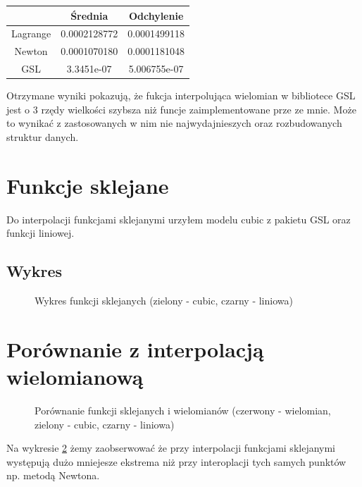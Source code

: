 \documentclass{article}
\begin{document}
    \vspace{10px}

    \begin{tabular}{|c|c|c|}
        \hline 
        &Średnia&Odchylenie\\
        \hline 
        Lagrange&0.0002128772&0.0001499118\\
        \hline 
        Newton&0.0001070180&0.0001181048\\
        \hline 
        GSL&3.3451e-07&5.006755e-07\\
        \hline 
    \end{tabular}

    \vspace{10px}
    
    Otrzymane wyniki pokazują, że fukcja interpolująca wielomian w bibliotece GSL jest o 3 rzędy wielkości szybsza niż funcje zaimplementowane prze ze mnie. 
    Może to wynikać z zastosowanych w nim nie najwydajnieszych oraz rozbudowanych struktur danych. 

    \pagebreak

    \section{Funkcje sklejane}
    Do interpolacji funkcjami sklejanymi urzyłem modelu cubic z pakietu GSL oraz funkcji liniowej.
    
    
    \subsection{Wykres}
    \begin{figure}[h]
        \caption{\label{fig:splines} Wykres funkcji sklejanych (zielony - cubic, czarny - liniowa)}
    \end{figure}

    \pagebreak
    
    \section{Porównanie z interpolacją wielomianową}
    \begin{figure}[h]
        \caption{\label{fig:splinesAndPolys} Porównanie funkcji sklejanych i wielomianów (czerwony - wielomian, zielony - cubic, czarny - liniowa)}
    \end{figure}
    
    Na wykresie \ref{fig:splinesAndPolys} żemy zaobserwować że przy interpolacji funkcjami sklejanymi występują dużo mniejesze ekstrema niż przy interoplacji tych samych punktów np. metodą Newtona.
\end{document}
